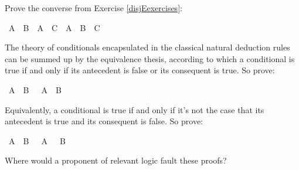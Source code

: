\begin{isabellebody}
\begin{isamarkuptext}
\end{isamarkuptext}\isamarkuptrue%
%
\begin{isamarkuptext}%
\begin{Exercise}  Prove the converse from Exercise \ref{disjEexercises}: \end{Exercise}%
\end{isamarkuptext}\isamarkuptrue%
\isamarkupfalse%
\ {\isachardoublequoteopen}{\isacharparenleft}A\ {\isasymor}\ B{\isacharparenright}\ {\isasymand}\ {\isacharparenleft}A\ {\isasymor}\ C{\isacharparenright}\ {\isasymlongrightarrow}\ A\ {\isasymor}\ B\ {\isasymand}\ C{\isachardoublequoteclose}%
\isadelimproof
\ %
\endisadelimproof
%
\isatagproof
{}\isamarkupfalse%
%
\endisatagproof
{\isafoldproof}%
%
\isadelimproof
%
\endisadelimproof
%
\begin{isamarkuptext}%
\begin{Exercise}[title = The Equivalence Thesis]
The theory of conditionals encapsulated in the classical natural deduction rules can be
summed up by the equivalence thesis, according to which a conditional is true if and only if
its antecedent is false or its consequent is true. So prove:  \end{Exercise}%
\end{isamarkuptext}\isamarkuptrue%
\isamarkupfalse%
\ {\isachardoublequoteopen}{\isacharparenleft}A\ {\isasymlongrightarrow}\ B{\isacharparenright}\ {\isasymlongleftrightarrow}\ {\isacharparenleft}{\isasymnot}\ A\ {\isasymor}\ B{\isacharparenright}{\isachardoublequoteclose}%
\isadelimproof
\ %
\endisadelimproof
%
\isatagproof
{}\isamarkupfalse%
%
\endisatagproof
{\isafoldproof}%
%
\isadelimproof
%
\endisadelimproof
%
\begin{isamarkuptext}%
Equivalently, a conditional is true if and only if it's not the case that its antecedent is
true and its consequent is false. So prove:%
\end{isamarkuptext}\isamarkuptrue%
\isamarkupfalse%
\ {\isachardoublequoteopen}{\isacharparenleft}A\ {\isasymlongrightarrow}\ B{\isacharparenright}\ {\isasymlongleftrightarrow}\ {\isasymnot}\ {\isacharparenleft}A\ {\isasymand}\ {\isasymnot}\ B{\isacharparenright}{\isachardoublequoteclose}%
\isadelimproof
\ %
\endisadelimproof
%
\isatagproof
{}\isamarkupfalse%
%
\endisatagproof
{\isafoldproof}%
%
\isadelimproof
%
\endisadelimproof
%
\begin{isamarkuptext}%
Where would a proponent of relevant logic fault these proofs?%

\end{isamarkuptext}
\end{isabellebody}
